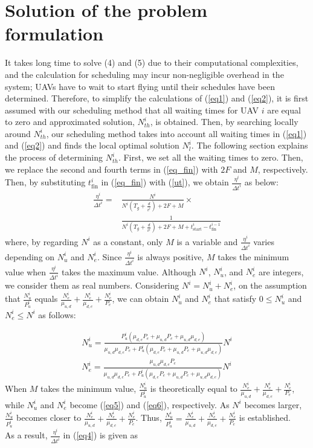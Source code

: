 \documentclass{ieeeaccess}
\begin{document}
\section{Solution of the problem formulation}\label{ape}
It takes long time to solve (4) and (5) due to their computational complexities, and the calculation for scheduling may incur non-negligible overhead in the system; UAVs have to wait to start flying until their schedules have been determined. Therefore, to simplify the calculations of (\ref{eq1}) and (\ref{eq2}), it is first assumed with our scheduling method that all waiting times for UAV $i$ are equal to zero and approximated solution, $N_{th}^i$, is obtained. Then, by searching locally around $N_{th}^i$, our scheduling method takes into account all waiting times in (\ref{eq1}) and (\ref{eq2}) and finds the local optimal solution $N_{l}^i$. The following section explains the process of determining $N_{th}^i$. First, we set all the waiting times to zero. Then, we replace the second and fourth terms in (\ref{eq_fin}) with $2F$ and $M$, respectively. Then, by substituting ${t_{\mathrm{fin}}^i}$ in (\ref{eq_fin}) with (\ref{ut}), we obtain $\frac{\eta^i}{{\Delta{t}}^i}$ as below:
%
\begin{align}
\frac{\eta^{i}}{{\Delta{t}}^i}
=&\frac{N^i}{N^i({T_g}+\frac{d}{v^i})+2F+M}\times\nonumber\\
&\frac{1}{N^i({T_g}+\frac{d}{v^i})+2F+M+t_{\mathrm{start}}^i-t_{\mathrm{fin}}^{i-1}}\label{eq4}
\end{align}
%
where, by regarding $N^i$ as a constant, only $M$ is a variable and $\frac{\eta^{i}}{{\Delta{t}}^i}$ varies depending on $N_u^i$ and $N_e^i$. Since $\frac{\eta^{i}}{{\Delta{t}}^i}$ is always positive, $M$ takes the minimum value when $\frac{\eta^{i}}{{\Delta{t}}^i}$ takes the maximum value. Although $N^i$, $N_u^i$, and $N_e^i$ are integers, we consider them as real numbers. Considering $N^i=N_u^i + N_e^i$, on the assumption that $\frac{N_u^i}{P_u^i}$ equals $\frac{N_e^i}{\mu_{u,d}}+\frac{N_e^i}{\mu_{d,e}}+\frac{N_e^i}{P_e}$, we can obtain $N_u^i$ and $N_e^i$ that satisfy $0\leq{N_u^i}$ and ${N_e^i}\leq{N^i}$ as follows:

\begin{align}
N_u^i=\frac{P_u^i(\mu_{d,e}P_e+\mu_{u,d}P_e+\mu_{u,d}\mu_{d,e})}{\mu_{u,d}\mu_{d,e}P_e+P_u^i(\mu_{d,e}P_e+\mu_{u,d}P_e+\mu_{u,d}\mu_{d,e})}N^i\label{eq5}\\
N_e^i=\frac{\mu_{u,d}\mu_{d,e}P_e}{\mu_{u,d}\mu_{d,e}P_e+P_u^i(\mu_{d,e}P_e+\mu_{u,d}P_e+\mu_{u,d}\mu_{d,e})}N^i\label{eq6}
\end{align}
%
When $M$ takes the minimum value, $\frac{N_u^i}{P_u^i}$ is theoretically equal to $\frac{N_e^i}{\mu_{u,d}}+\frac{N_e^i}{\mu_{d,e}}+\frac{N_e^i}{P_e}$, while $N_u^i$ and $N_e^i$ become (\ref{eq5}) and (\ref{eq6}), respectively. As $N^i$ becomes larger, $\frac{N_u^i}{P_u^i}$ becomes closer to $\frac{N_e^i}{\mu_{u,d}}+\frac{N_e^i}{\mu_{d,e}}+\frac{N_e^i}{P_e}$. Thus, $\frac{N_u^i}{P_u^i}=\frac{N_e^i}{\mu_{u,d}}+\frac{N_e^i}{\mu_{d,e}}+\frac{N_e^i}{P_e}$ is established.\\ As a result, $\frac{\eta^{i}}{{\Delta{t}}^i}$ in (\ref{eq4}) is given as
\end{document}
